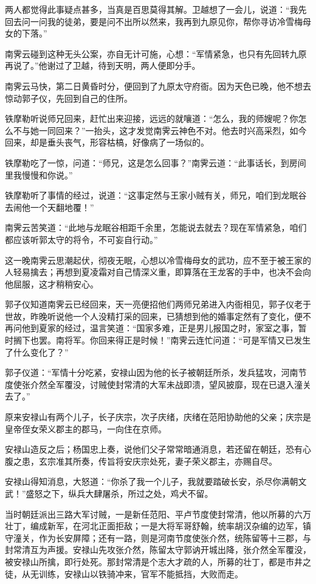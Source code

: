 \documentclass[12pt,oneside]{book}
\begin{document}
两人都觉得此事疑点甚多，当真是百思莫得其解。卫越想了一会儿，说道：``我先回去问一问我的徒弟，要是问不出所以然来，我再到九原见你，帮你寻访冷雪梅母女的下落。''

南霁云碰到这种无头公案，亦自无计可施，心想：``军情紧急，也只有先回转九原再说了。''他谢过了卫越，待到天明，两人便即分手。

南霁云马快，第二日黄昏时分，便回到了九原太守府衙。因为天色已晚，他不想去惊动郭子仪，先回到自己的住所。

铁摩勒听说师兄回来，赶忙出来迎接，远远的就嚷道：``怎么，我的师嫂呢？你怎么不与她一同回来？''一抬头，这才发觉南霁云神色不对。他去时兴高采烈，如今回来，却是垂头丧气，形容枯槁，好像病了一场似的。

铁摩勒吃了一惊，问道：``师兄，这是怎么回事？''南霁云道：``此事话长，到房间里我慢慢和你说。''

铁摩勒听了事情的经过，说道：``这事定然与王家小贼有关，师兄，咱们到龙眠谷去闹他一个天翻地覆！''

南霁云苦笑道：``此地与龙眠谷相距千余里，怎能说去就去？现在军情紧急，咱们都应该听郭太守的将令，不可妄自行动。''

这一晚南霁云思潮起伏，彻夜无眠，心想以冷雪梅母女的武功，应不至于被王家的人轻易擒去；再想到夏凌霜对自己情深义重，即算落在王龙客的手中，也决不会向他屈服，这才稍稍安心。

郭子仪知道南霁云已经回来，天一亮便招他们两师兄弟进入内衙相见，郭子仪老于世故，昨晚听说他一个人没精打采的回来，已猜想到他的婚事定然有了变化，便不再问他到夏家的经过，温言笑道：``国家多难，正是男儿报国之时，家室之事，暂时搁下也罢。南将军。你回来得正是时候！''南霁云连忙问道：``可是军情又已发生了什么变化了？''

郭子仪道：``军情十分吃紧，安禄山因为他的长子被朝廷所杀，发兵猛攻，河南节度使张介然全军覆没，讨贼使封常清的大军未战即溃，望风披靡，现在已退入潼关去了。''

原来安禄山有两个儿子，长子庆宗，次子庆绪，庆绪在范阳协助他的父亲；庆宗是皇帝侄女荣义郡主的郡马，一向住在京师。

安禄山造反之后；杨国忠上奏，说他们父子常常暗通消息，若还留在朝廷，恐有心腹之患，玄宗准其所奏，传旨将安庆宗处死，妻子荣义郡主，亦赐自尽。

安禄山得知消息，大怒道：``你杀了我一个儿子，我就要踏破长安，杀尽你满朝文武！''盛怒之下，纵兵大肆屠杀，所过之处，鸡犬不留。

当时朝廷派出三路大军讨贼，一是新任范阳、平卢节度使封常清，他以所募的六万壮丁，编成新军，在河北正面拒敌；一是大将军哥舒翰，统率胡汉杂编的边军，镇守潼关，作为长安屏障；还有一路，则是河南节度使张介然，统陈留等十三郡，与封常清互为声援。安禄山先攻张介然，陈留太守郭讷开城出降，张介然全军覆没，被安禄山所擒，即行处死。那封常清是个志大才疏的人，所募的壮丁，都是市井之徒，从无训练，安禄山以铁骑冲来，官军不能抵挡，大败而走。
\end{document}
